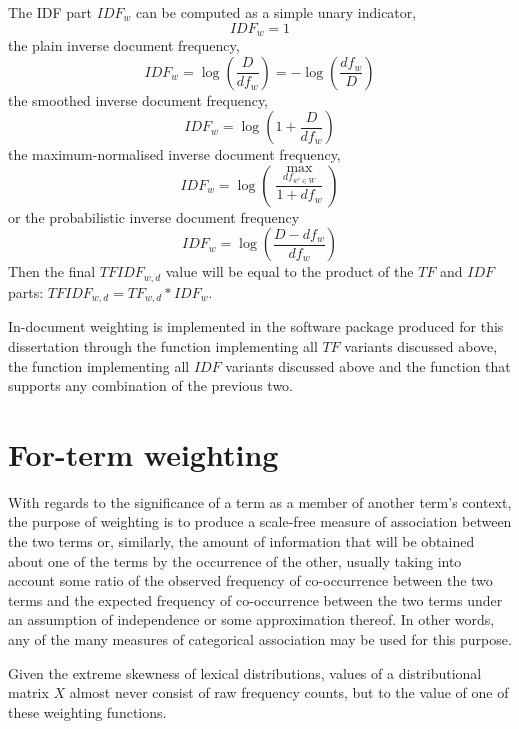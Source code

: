 The IDF part $IDF_{w}$ can be computed as a simple unary indicator,
    $$ IDF_{w} = 1 $$
the plain inverse document frequency,
    $$ IDF_{w} = \log \left( \frac{D}{df_{w}} \right) = - \log \left( \frac{df_{w}}{D} \right) $$
the smoothed inverse document frequency,
    $$ IDF_{w} = \log \left( 1 + \frac{D}{df_{w}} \right) $$
the maximum-normalised inverse document frequency,
    $$ IDF_{w} = \log \left( \frac{\max_{df_{w' \in W}}}{1 + df_w} \right) $$
or the probabilistic inverse document frequency
    $$ IDF_{w} = \log \left( \frac{D - df_{w}}{df_w} \right) $$
Then the final $TFIDF_{w,d}$ value will be equal to the product of the $TF$ and $IDF$ parts: $TFIDF_{w,d} = TF_{w,d} * IDF_{w}$.

In-document weighting is implemented in the  software package produced for this dissertation through the  function implementing all $TF$ variants discussed above, the  function implementing all $IDF$ variants discussed above and the  function that supports any combination of the previous two.

\section{For-term weighting}

With regards to the significance of a term as a member of another term's context, the purpose of weighting is to produce a scale-free measure of association between the two terms or, similarly, the amount of information that will be obtained about one of the terms by the occurrence of the other, usually taking into account some ratio of the observed frequency of co-occurrence between the two terms and the expected frequency of co-occurrence between the two terms under an assumption of independence or some approximation thereof.
In other words, any of the many measures of categorical association may be used for this purpose.

Given the extreme skewness of lexical distributions, values of a distributional matrix $X$ almost never consist of raw frequency counts, but to the value of one of these weighting functions.

